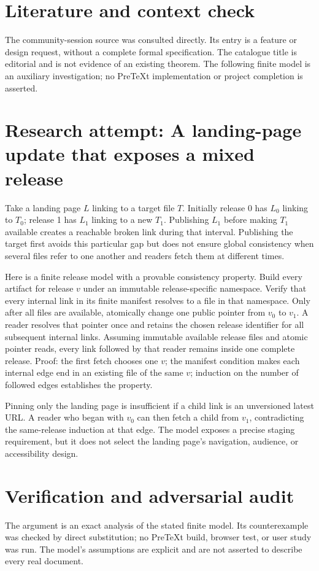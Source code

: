 \documentclass[11pt]{article}
\begin{document}
\section{Literature and context check}
The community-session source was consulted directly. Its entry is a feature or design request, without a complete formal specification. The catalogue title is editorial and is not evidence of an existing theorem. The following finite model is an auxiliary investigation; no PreTeXt implementation or project completion is asserted.
\section{Research attempt: A landing-page update that exposes a mixed release}
Take a landing page $L$ linking to a target file $T$. Initially release 0 has $L_0$ linking to $T_0$; release 1 has $L_1$ linking to a new $T_1$. Publishing $L_1$ before making $T_1$ available creates a reachable broken link during that interval. Publishing the target first avoids this particular gap but does not ensure global consistency when several files refer to one another and readers fetch them at different times.

Here is a finite release model with a provable consistency property. Build every artifact for release $v$ under an immutable release-specific namespace. Verify that every internal link in its finite manifest resolves to a file in that namespace. Only after all files are available, atomically change one public pointer from $v_0$ to $v_1$. A reader resolves that pointer once and retains the chosen release identifier for all subsequent internal links. Assuming immutable available release files and atomic pointer reads, every link followed by that reader remains inside one complete release. Proof: the first fetch chooses one $v$; the manifest condition makes each internal edge end in an existing file of the same $v$; induction on the number of followed edges establishes the property.

Pinning only the landing page is insufficient if a child link is an unversioned latest URL. A reader who began with $v_0$ can then fetch a child from $v_1$, contradicting the same-release induction at that edge. The model exposes a precise staging requirement, but it does not select the landing page's navigation, audience, or accessibility design.
\section{Verification and adversarial audit}
The argument is an exact analysis of the stated finite model. Its counterexample was checked by direct substitution; no PreTeXt build, browser test, or user study was run. The model's assumptions are explicit and are not asserted to describe every real document.
\end{document}
